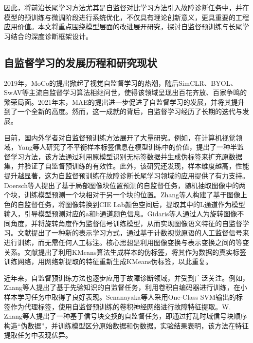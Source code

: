 \documentclass[master]{thesis-uestc}
\begin{document}
因此，将前沿长尾学习方法尤其是自监督对比学习方法引入故障诊断任务中，并在模型的预训练与微调阶段进行系统优化，不仅具有理论创新意义，更具重要的工程应用价值。本文将重点围绕模型层面的改进展开研究，探讨自监督预训练与长尾学习结合的深度诊断框架设计。

\FloatBarrier  %

\subsection{自监督学习的发展历程和研究现状}

2019年，MoCo的提出掀起了视觉自监督学习的热潮，随后SimCLR、BYOL、SwAV等主流自监督学习算法相继问世，使得该领域呈现出百花齐放、百家争鸣的繁荣局面。2021年末，MAE的提出进一步促进了自监督学习的发展，并将其提升到了一个全新的高度。然而，这一成就的背后，自监督学习经历了长期的迭代与发展。

目前，国内外学者对自监督预训练方法展开了大量研究。例如，在计算机视觉领域，Yang等人研究了不平衡样本标签信息在模型训练中的价值，提出了一种半监督学习方法，该方法通过利用原模型识别无标签数据并生成伪标签来扩充原数据集，并验证了自监督预训练的有效性。此外，该研究还发现，样本维度越高，性能提升越显著，这为自监督预训练在故障诊断长尾学习领域的应用提供了有力支持。Doersch等人提出了基于局部图像块位置预测的自监督任务，随机抽取图像中的两个块，训练模型预测一个块相对于另一个块的位置。Zhang等人构建了基于图像上色的自监督任务，将图像转换到CIE Lab颜色空间后，提取其中的L通道作为模型输入，引导模型预测对应的a和b通道颜色信息。Gidaris等人通过人为旋转图像不同角度，并将旋转角度作为监督信号训练模型，从而实现图像语义特征的自监督学习。文献\cite{noroozi2017representation}提出了一种新的表示学习方式，通过基于计数视觉原语的人工监督信号来进行训练，而无需任何人工标注。核心思想是利用图像变换与表示变换之间的等变关系。文献\cite{caron2018deep}提出了利用KMeans算法生成样本的伪标签，将其作为数据的真实标签训练网络，用网络新提取的特征重新生成KMeans伪标签，以此重复。

近年来，自监督预训练方法也逐步应用于故障诊断领域，并受到广泛关注。例如，Zhang等人提出了基于先验知识的自监督任务，利用卷积自编码器进行训练，在小样本学习任务中取得了良好表现。Senanayaka等人采用One-Class SVM输出的标签作为代理标签，使用自监督预训练的卷积神经网络进行故障特征提取。W. Zhang等人提出了一种基于信号块交换的自监督任务，即通过打乱时域信号块顺序构造“伪数据”，并训练模型区分原始数据和伪数据。实验结果表明，该方法在特征提取任务中表现优异。
\end{document}
